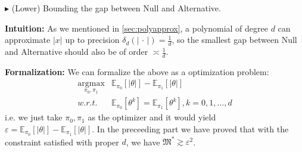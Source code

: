 \documentclass[11pt,a4paper]{article}
\numberwithin{equation}{section}%
\newenvironment{point}{\raggedright$\blacktriangleright$}{}
\begin{document}
\begin{point}
    (Lower) Bounding the gap between Null and Alternative.
\end{point}

\textbf{Intuition: }As we mentioned in \autoref{sec:polyapprox}, a polynomial of degree $ d $ can approximate $ \left\vert x \right\vert  $ up to precision $ \delta _d(\left\vert \, \cdot \,  \right\vert ) = \frac{1}{d} $, so the smallest gap between Null and Alternative should also be of order $ \asymp \frac{1}{d} $.

\textbf{Formalization: }We can formalize the above as a optimization problem:
\begin{align*}
    \mathop{ \arg\max }\limits_{\pi_0,\pi_1}& \mathbb{E}_{ \pi_0 }\left[ \left\vert \theta  \right\vert  \right] -\mathbb{E}_{ \pi_1 }\left[ \left\vert \theta  \right\vert  \right]\\
    w.r.t.& \mathbb{E}_{ \pi_0 }\left[ \theta ^k \right] =\mathbb{E}_{ \pi_1 }\left[ \theta ^k \right], k=0,1,\ldots,d
\end{align*}
i.e. we just take $ \pi_0,\pi_1 $ as the optimizer and it would yield $ \varepsilon =  \mathbb{E}_{ \pi_0 }\left[ \left\vert \theta  \right\vert  \right] -\mathbb{E}_{ \pi_1 }\left[ \left\vert \theta  \right\vert  \right]$. In the preceeding part we have proved that with the constraint satisfied with proper $ d $, we have $ \mathfrak{M}^* \gtrsim \varepsilon ^2 $.
\end{document}
